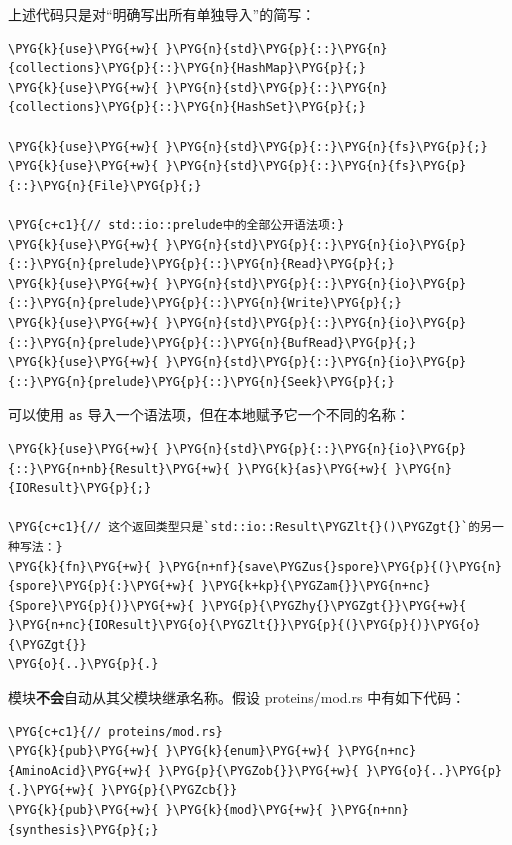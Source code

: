 上述代码只是对“明确写出所有单独导入”的简写：

\begin{Verbatim}[commandchars=\\\{\},breaklines=true,breakanywhere=true,fontsize=\codefont,xleftmargin=17bp]
\PYG{k}{use}\PYG{+w}{ }\PYG{n}{std}\PYG{p}{::}\PYG{n}{collections}\PYG{p}{::}\PYG{n}{HashMap}\PYG{p}{;}
\PYG{k}{use}\PYG{+w}{ }\PYG{n}{std}\PYG{p}{::}\PYG{n}{collections}\PYG{p}{::}\PYG{n}{HashSet}\PYG{p}{;}

\PYG{k}{use}\PYG{+w}{ }\PYG{n}{std}\PYG{p}{::}\PYG{n}{fs}\PYG{p}{;}
\PYG{k}{use}\PYG{+w}{ }\PYG{n}{std}\PYG{p}{::}\PYG{n}{fs}\PYG{p}{::}\PYG{n}{File}\PYG{p}{;}

\PYG{c+c1}{// std::io::prelude中的全部公开语法项:}
\PYG{k}{use}\PYG{+w}{ }\PYG{n}{std}\PYG{p}{::}\PYG{n}{io}\PYG{p}{::}\PYG{n}{prelude}\PYG{p}{::}\PYG{n}{Read}\PYG{p}{;}
\PYG{k}{use}\PYG{+w}{ }\PYG{n}{std}\PYG{p}{::}\PYG{n}{io}\PYG{p}{::}\PYG{n}{prelude}\PYG{p}{::}\PYG{n}{Write}\PYG{p}{;}
\PYG{k}{use}\PYG{+w}{ }\PYG{n}{std}\PYG{p}{::}\PYG{n}{io}\PYG{p}{::}\PYG{n}{prelude}\PYG{p}{::}\PYG{n}{BufRead}\PYG{p}{;}
\PYG{k}{use}\PYG{+w}{ }\PYG{n}{std}\PYG{p}{::}\PYG{n}{io}\PYG{p}{::}\PYG{n}{prelude}\PYG{p}{::}\PYG{n}{Seek}\PYG{p}{;}
\end{Verbatim}

可以使用 \texttt{as} 导入一个语法项，但在本地赋予它一个不同的名称：

\begin{Verbatim}[commandchars=\\\{\},breaklines=true,breakanywhere=true,fontsize=\codefont,xleftmargin=17bp]
\PYG{k}{use}\PYG{+w}{ }\PYG{n}{std}\PYG{p}{::}\PYG{n}{io}\PYG{p}{::}\PYG{n+nb}{Result}\PYG{+w}{ }\PYG{k}{as}\PYG{+w}{ }\PYG{n}{IOResult}\PYG{p}{;}

\PYG{c+c1}{// 这个返回类型只是`std::io::Result\PYGZlt{}()\PYGZgt{}`的另一种写法：}
\PYG{k}{fn}\PYG{+w}{ }\PYG{n+nf}{save\PYGZus{}spore}\PYG{p}{(}\PYG{n}{spore}\PYG{p}{:}\PYG{+w}{ }\PYG{k+kp}{\PYGZam{}}\PYG{n+nc}{Spore}\PYG{p}{)}\PYG{+w}{ }\PYG{p}{\PYGZhy{}\PYGZgt{}}\PYG{+w}{ }\PYG{n+nc}{IOResult}\PYG{o}{\PYGZlt{}}\PYG{p}{(}\PYG{p}{)}\PYG{o}{\PYGZgt{}}
\PYG{o}{..}\PYG{p}{.}
\end{Verbatim}

模块\textbf{不会}自动从其父模块继承名称。假设 proteins/\allowbreak{}mod.rs 中有如下代码：

\begin{Verbatim}[commandchars=\\\{\},breaklines=true,breakanywhere=true,fontsize=\codefont,xleftmargin=17bp]
\PYG{c+c1}{// proteins/mod.rs}
\PYG{k}{pub}\PYG{+w}{ }\PYG{k}{enum}\PYG{+w}{ }\PYG{n+nc}{AminoAcid}\PYG{+w}{ }\PYG{p}{\PYGZob{}}\PYG{+w}{ }\PYG{o}{..}\PYG{p}{.}\PYG{+w}{ }\PYG{p}{\PYGZcb{}}
\PYG{k}{pub}\PYG{+w}{ }\PYG{k}{mod}\PYG{+w}{ }\PYG{n+nn}{synthesis}\PYG{p}{;}
\end{Verbatim}

